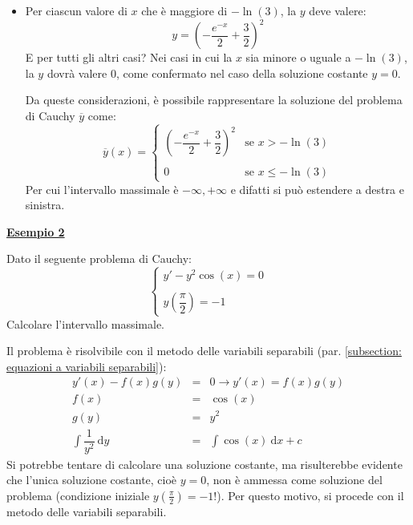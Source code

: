 \documentclass[a4paper]{article}
\newcommand{\example}[1]{\textcolor{Green4}{\textbf{#1}}}
\begin{document}
\begin{itemize}
		\item Per ciascun valore di $x$ che è maggiore di $-\ln\left(3\right)$, la $y$ deve valere:
		\begin{equation*}
			y = \left(-\dfrac{e^{-x}}{2} + \dfrac{3}{2}\right)^{2}
		\end{equation*}
		E per tutti gli altri casi? Nei casi in cui la $x$ sia minore o uguale a $-\ln\left(3\right)$, la $y$ dovrà valere $0$, come confermato nel caso della soluzione costante $y = 0$.

		Da queste considerazioni, è possibile rappresentare la soluzione del problema di Cauchy $\overline{y}$ come:
		\begin{equation*}
			\overline{y}\left(x\right) = \begin{cases}
				\left(-\dfrac{e^{-x}}{2} + \dfrac{3}{2}\right)^{2} 	& \text{se } x > -\ln\left(3\right) \\
				\\
				0													& \text{se } x \le -\ln\left(3\right)
			\end{cases}
		\end{equation*}
		Per cui l'intervallo massimale è $-\infty,+\infty$ e difatti si può estendere a destra e sinistra.
	\end{itemize}

	\begin{flushleft}
		\example{\underline{Esempio 2}}
	\end{flushleft}

	\noindent
	Dato il seguente problema di Cauchy:
	\begin{equation*}
		\begin{cases}
			y'-y^{2}\cos\left(x\right) = 0 \\
			\\
			y\left(\dfrac{\pi}{2}\right) = -1
		\end{cases}
	\end{equation*}
	Calcolare l'intervallo massimale.\newline

	\noindent
	Il problema è risolvibile con il metodo delle variabili separabili (par. \ref{subsection: equazioni a variabili separabili}):
	\begin{equation*}
		\begin{array}{rcl}
			y'\left(x\right) - f\left(x\right) g\left(y\right) &=& 0 \longrightarrow y'\left(x\right) = f\left(x\right) g\left(y\right) \\
			f\left(x\right) &=& \cos\left(x\right) \\
			g\left(y\right) &=& y^{2} \\ [1em]
			\displaystyle\int \dfrac{1}{y^{2}} \: \mathrm{d}y &=& \displaystyle\int \cos\left(x\right) \: \mathrm{d}x + c
		\end{array}
	\end{equation*}
	Si potrebbe tentare di calcolare una soluzione costante, ma risulterebbe evidente che l'unica soluzione costante, cioè $y = 0$, non è ammessa come soluzione del problema (condizione iniziale $y\left(\frac{\pi}{2}\right) = -1$!). Per questo motivo, si procede con il metodo delle variabili separabili.\newline
\end{document}
